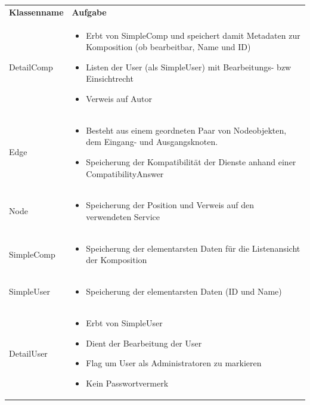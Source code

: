 \begin{table}
	\begin{tabularx}{\textwidth}{p{} | X}
		\rowcolor[HTML]{C0C0C0}
		\textbf{Klassenname} & \textbf{Aufgabe} \\
		DetailComp & \compress \begin{itemize}
			\item Erbt von SimpleComp und speichert damit Metadaten zur Komposition (ob bearbeitbar, Name und ID)
			\item Listen der User (als SimpleUser) mit Bearbeitungs- bzw Einsichtrecht
			\item Verweis auf Autor
		\end{itemize}\\
		\rowcolor[HTML]{E7E7E7}
		Edge & \compress \begin{itemize}
		  \item Besteht aus einem geordneten Paar von Nodeobjekten, dem Eingang- und Ausgangsknoten.
			\item Speicherung der Kompatibilität der Dienste anhand einer CompatibilityAnswer
		\end{itemize}\\
		Node & \compress \begin{itemize}
			\item Speicherung der Position und Verweis auf den verwendeten Service
		\end{itemize}\\
		\rowcolor[HTML]{E7E7E7}
		SimpleComp & \compress \begin{itemize}
			\item Speicherung der elementarsten Daten für die Listenansicht der Komposition
		\end{itemize}\\
		SimpleUser  & \compress \begin{itemize}
			\item Speicherung der elementarsten Daten (ID und Name)
		\end{itemize}\\
		\rowcolor[HTML]{E7E7E7}
		DetailUser & \compress \begin{itemize}
			\item Erbt von SimpleUser
			\item Dient der Bearbeitung der User
			\item Flag um User als Administratoren zu markieren
			\item Kein Passwortvermerk
		\end{itemize}\\

\end{tabularx}
\end{table}
